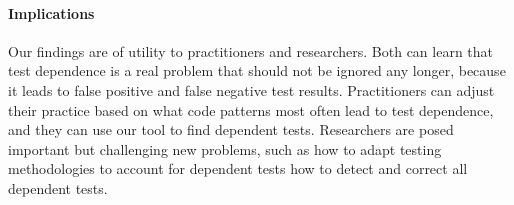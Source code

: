 \paragraph{Implications}
Our findings are of utility to practitioners and researchers.
Both can learn that test dependence is a real problem that should not be
ignored any longer, because it leads to false positive and false negative
test results.
Practitioners can adjust their practice based on what code patterns most
often lead to test dependence, and they can use our tool to 
find dependent tests.
Researchers are posed important but challenging new problems, such as how
to adapt testing methodologies to account for dependent tests how to detect
and correct all dependent tests.




